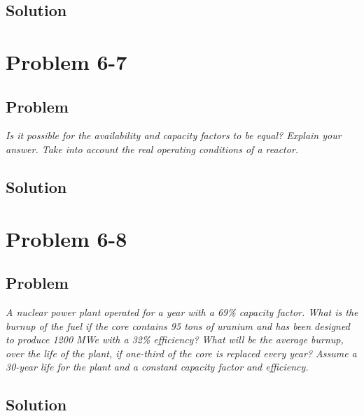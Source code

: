 \subsection{Solution}



\section{Problem 6-7}
\label{prob67}


\subsection{Problem}
\textit{Is it possible for the availability and capacity factors to be equal? Explain your answer. Take into account the real operating conditions of a reactor.}

\subsection{Solution}



\section{Problem 6-8}
\label{prob68}


\subsection{Problem}
\textit{A nuclear power plant operated for a year with a 69\% capacity factor. What is the burnup of the fuel if the core contains 95 tons of uranium and has been designed to produce 1200 MWe with a 32\% efficiency? What will be the average burnup, over the life of the plant, if one-third of the core is replaced every year? Assume a 30-year life for the plant and a constant capacity factor and efficiency.}

\subsection{Solution}

